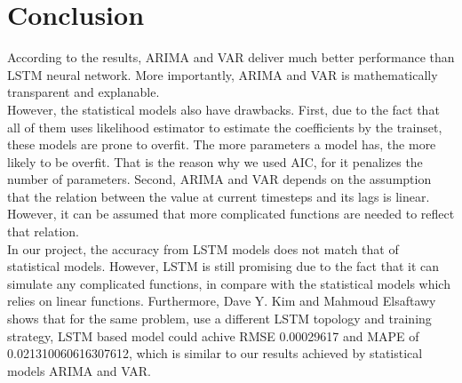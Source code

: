 \documentclass[11pt]{article}
\begin{document}
\section{Conclusion}
According to the results, ARIMA and VAR deliver much better performance than LSTM
neural network. More importantly, ARIMA and VAR is mathematically transparent
and explanable.\\
However, the statistical models also have drawbacks. First, due to the fact that
all of them uses likelihood estimator to estimate the coefficients by the
trainset, these models are prone to overfit. The more parameters a model has,
the more likely to be overfit. That is the reason why we used AIC, for it
penalizes the number of parameters. Second, ARIMA and VAR depends on the assumption
that the relation between the value at current timesteps and its lags is linear.
However, it can be assumed that more complicated functions are needed to reflect
that relation.\\
In our project, the accuracy from LSTM models does not match that of statistical
models. However, LSTM is still promising due to the fact that it can simulate
any complicated functions, in compare with the statistical models which relies
on linear functions. Furthermore, Dave Y. Kim and Mahmoud Elsaftawy
\cite{kimy07lstm} shows that for the same problem, use a different LSTM topology
and training strategy, LSTM based model could achive RMSE 0.00029617
and MAPE of 0.021310060616307612, which is similar to our results achieved by
statistical models ARIMA and VAR.
\pagebreak 


\end{document}
